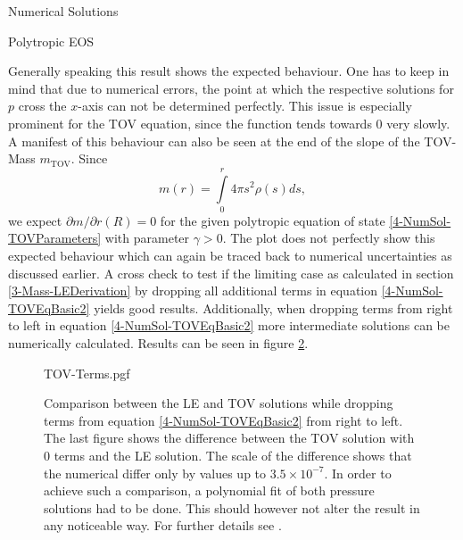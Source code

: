 \begin{section}{Numerical Solutions}
\begin{subsection}{Polytropic EOS}
\begin{figure}[H]
	\label{4-NumSol-TOVEqEasyEOS}
\end{figure}\noindent
Generally speaking this result shows the expected behaviour. One has to keep in mind that due to numerical errors, the point at which the respective solutions for $p$ cross the $x$-axis can not be determined perfectly. This issue is especially prominent for the TOV equation, since the function tends towards $0$ very slowly.\\
A manifest of this behaviour can also be seen at the end of the slope of the TOV-Mass $m_{\text{TOV}}$. Since
\begin{equation}
	m(r) = \int\limits_0^r 4\pi s^2\rho(s)ds,
\end{equation}
we expect $\partial m/\partial r(R)=0$ for the given polytropic equation of state \ref{4-NumSol-TOVParameters} with parameter $\gamma>0$. The plot does not perfectly show this expected behaviour which can again be traced back to numerical uncertainties as discussed earlier.
A cross check to test if the limiting case as calculated in section \ref{3-Mass-LEDerivation} by dropping all additional terms in equation \ref{4-NumSol-TOVEqBasic2} yields good results. Additionally, when dropping terms from right to left in equation \ref{4-NumSol-TOVEqBasic2} more intermediate solutions can be numerically calculated. Results can be seen in figure \ref{4-NumSol-TovTerms}.
\begin{figure}[H]
	\centering
	{TOV-Terms.pgf}
	\caption[Comparison LE and partial TOV]{Comparison between the LE and TOV solutions while dropping terms from equation \ref{4-NumSol-TOVEqBasic2} from right to left. The last figure shows the difference between the TOV solution with 0 terms and the LE solution. The scale of the difference shows that the numerical differ only by values up to $3.5\times10^{-7}$. In order to achieve such a comparison, a polynomial fit of both pressure solutions had to be done. This should however not alter the result in any noticeable way. For further details see \cite{pleyerGithubRepositoryJonas}.}
	\label{4-NumSol-TovTerms}
\end{figure}


\end{subsection}
\end{section}

